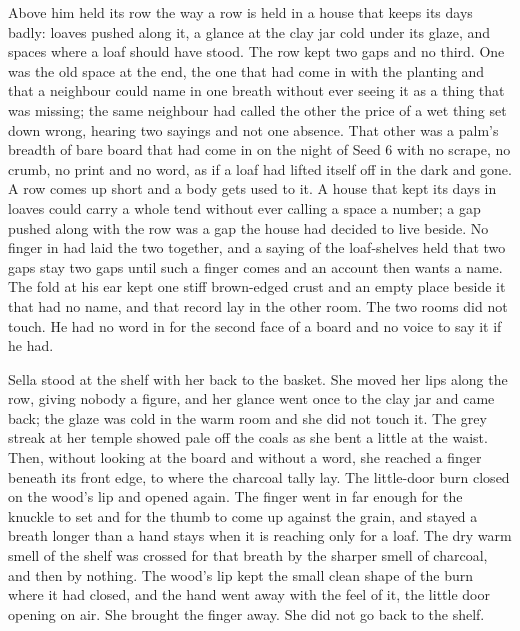 Above him  held its row the way a row is held in a house that keeps its days badly: loaves pushed along it, a glance at the clay jar cold under its glaze, and spaces where a loaf should have stood. The row kept two gaps and no third. One was the old space at the end, the one that had come in with the planting and that a neighbour could name in one breath without ever seeing it as a thing that was missing; the same neighbour had called the other the price of a wet thing set down wrong, hearing two sayings and not one absence. That other was a palm's breadth of bare board that had come in on the night of Seed 6 with no scrape, no crumb, no print and no word, as if a loaf had lifted itself off in the dark and gone. A row comes up short and a body gets used to it. A house that kept its days in loaves could carry a whole tend without ever calling a space a number; a gap pushed along with the row was a gap the house had decided to live beside. No finger in  had laid the two together, and a saying of the loaf-shelves held that two gaps stay two gaps until such a finger comes and an account then wants a name. The fold at his ear kept one stiff brown-edged crust and an empty place beside it that had no name, and that record lay in the other room. The two rooms did not touch. He had no word in  for the second face of a board and no voice to say it if he had.

Sella stood at the shelf with her back to the basket. She moved her lips along the row, giving nobody a figure, and her glance went once to the clay jar and came back; the glaze was cold in the warm room and she did not touch it. The grey streak at her temple showed pale off the coals as she bent a little at the waist. Then, without looking at the board and without a word, she reached a finger beneath its front edge, to where the charcoal tally lay. The little-door burn closed on the wood's lip and opened again. The finger went in far enough for the knuckle to set and for the thumb to come up against the grain, and stayed a breath longer than a hand stays when it is reaching only for a loaf. The dry warm smell of the shelf was crossed for that breath by the sharper smell of charcoal, and then by nothing. The wood's lip kept the small clean shape of the burn where it had closed, and the hand went away with the feel of it, the little door opening on air. She brought the finger away. She did not go back to the shelf.

